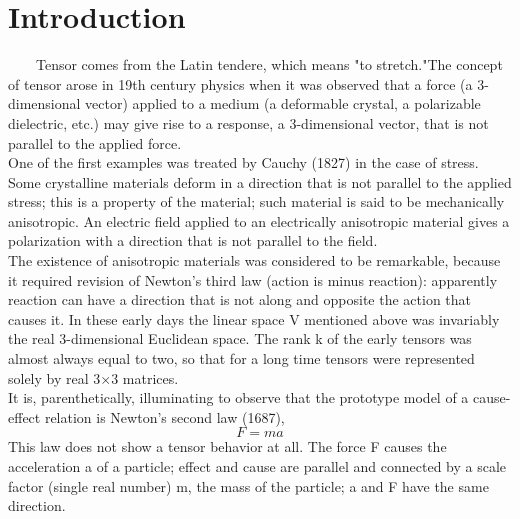 \documentclass[12pt,a4paper]{article}
\begin{document}
\section*{Introduction}
\ \ \ \ 
Tensor comes from the Latin tendere, which means "to stretch."The concept of tensor arose in 19th century physics when it was observed that a force (a 3-dimensional vector) applied to a medium (a deformable crystal, a polarizable dielectric, etc.) may give rise to a response, a 3-dimensional vector, that is not parallel to the applied force. \\ One of the first examples was treated by Cauchy (1827) in the case of stress. Some crystalline materials deform in a direction that is not parallel to the applied stress; this is a property of the material; such material is said to be mechanically anisotropic. An electric field applied to an electrically anisotropic material gives a polarization with a direction that is not parallel to the field. \\The existence of anisotropic materials was considered to be remarkable, because it required revision of Newton's third law (action is minus reaction): apparently reaction can have a direction that is not along and opposite the action that causes it. In these early days the linear space V mentioned above was invariably the real 3-dimensional Euclidean space. The rank k of the early tensors was almost always equal to two, so that for a long time tensors were represented solely by real 3$\times$3 matrices.
\\It is, parenthetically, illuminating to observe that the prototype model of a cause-effect relation is Newton's second law (1687),
\begin{equation}
F = ma
\end{equation}
This law does not show a tensor behavior at all. The force F causes the acceleration a of a particle; effect and cause are parallel and connected by a scale factor (single real number) m, the mass of the particle; a and F have the same direction.\\
\end{document}
